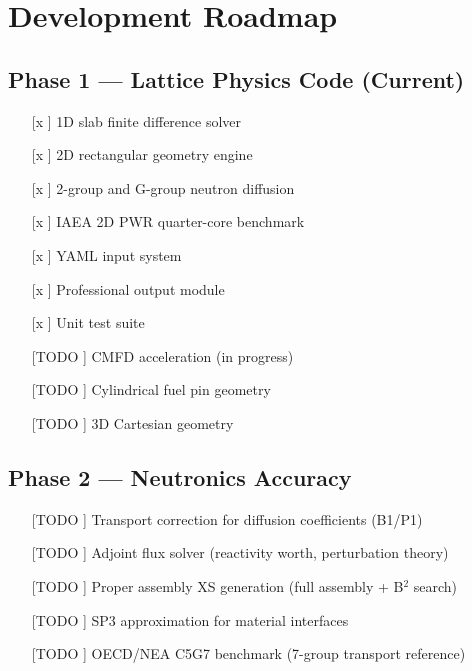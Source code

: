 \documentclass[12pt,a4paper]{article}
\begin{document}
\section{Development Roadmap}

\subsection{Phase 1 --- Lattice Physics Code (Current)}

\begin{itemize}[leftmargin=*]
    \item[[x]] 1D slab finite difference solver
    \item[[x]] 2D rectangular geometry engine
    \item[[x]] 2-group and G-group neutron diffusion
    \item[[x]] IAEA 2D PWR quarter-core benchmark
    \item[[x]] YAML input system
    \item[[x]] Professional output module
    \item[[x]] Unit test suite
    \item[[TODO]] CMFD acceleration (in progress)
    \item[[TODO]] Cylindrical fuel pin geometry
    \item[[TODO]] 3D Cartesian geometry
\end{itemize}

\subsection{Phase 2 --- Neutronics Accuracy}

\begin{itemize}[leftmargin=*]
    \item[[TODO]] Transport correction for diffusion coefficients (B1/P1)
    \item[[TODO]] Adjoint flux solver (reactivity worth, perturbation theory)
    \item[[TODO]] Proper assembly XS generation (full assembly + B$^2$ search)
    \item[[TODO]] SP3 approximation for material interfaces
    \item[[TODO]] OECD/NEA C5G7 benchmark (7-group transport reference)
\end{itemize}
\end{document}
